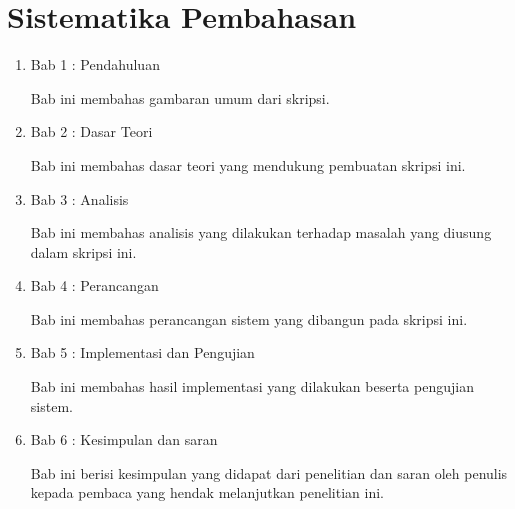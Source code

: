 \section{Sistematika Pembahasan}
\label{sec:sispem}
\begin{enumerate}
\item Bab 1 : Pendahuluan

Bab ini membahas gambaran umum dari skripsi.

\item Bab 2 : Dasar Teori

Bab ini membahas dasar teori yang mendukung pembuatan skripsi ini.

\item Bab 3 : Analisis

Bab ini membahas analisis yang dilakukan terhadap masalah yang diusung dalam skripsi ini.

\item Bab 4 : Perancangan

Bab ini membahas perancangan sistem yang dibangun pada skripsi ini.

\item Bab 5 : Implementasi dan Pengujian

Bab ini membahas hasil implementasi yang dilakukan beserta pengujian sistem.

\item Bab 6 : Kesimpulan dan saran

Bab ini berisi kesimpulan yang didapat dari penelitian dan saran oleh penulis kepada pembaca yang hendak melanjutkan penelitian ini. 

\end{enumerate}